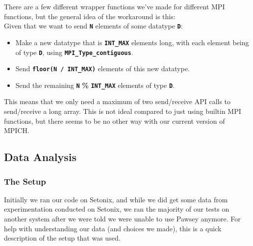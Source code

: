 \documentclass[11pt,leqno]{article}
\providecommand{\tightlist}{%
  \setlength{\itemsep}{0pt}\setlength{\parskip}{0pt}}
\begin{document}
\begin{flushleft}
There are a few different wrapper functions we've made for different MPI functions, but the general idea of the workaround is this: \\[2 ex]
Given that we want to send \textbf{\texttt{N}} elements of some datatype \textbf{\texttt{D}}:

\begin{itemize}[label=\textcolor{CtpMauve}{$-$}]
\tightlist
  \item Make a new datatype that is \textbf{\texttt{INT_MAX}} elements long, with each element being of type \textbf{\texttt{D}}, \newline using \textbf{\texttt{MPI_Type_contiguous}}.

  \item Send \textbf{\texttt{floor(N / INT_MAX)}} elements of this new datatype.

  \item Send the remaining \textbf{\texttt{N}} \textbf{\%} \textbf{\texttt{INT_MAX}} elements of type \textbf{\texttt{D}}.

\end{itemize}

This means that we only need a maximum of two send/receive API calls to send/receive a long array. This is not ideal compared to just using builtin MPI functions, but there seems to be no other way with our current version of MPICH.

\subsection{Data Analysis}\label{data-anaylsis}

\subsubsection{The Setup}\label{the-setup}

Initially we ran our code on Setonix, and while we did get some data from experimentation conducted on Setonix, we ran the majority of our tests on another system after we were told we were unable to use Pawsey anymore. For help with understanding our data (and choices we made), this is a quick description of the setup that was used. \\[2 ex]


\end{flushleft}
\end{document}
